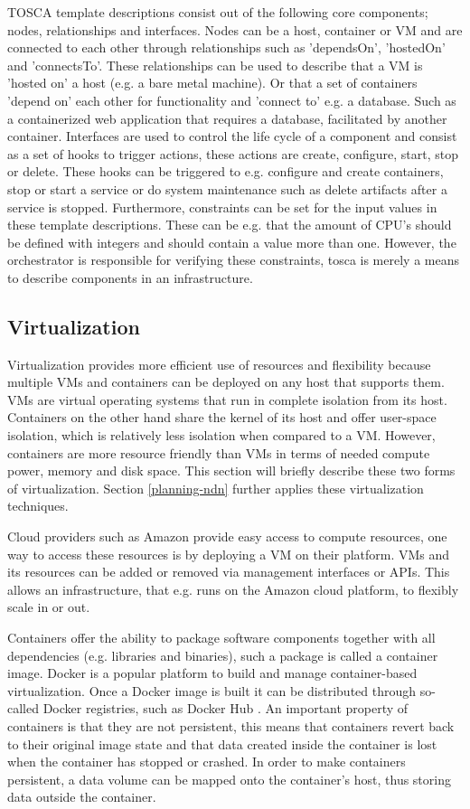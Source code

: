 TOSCA template descriptions consist out of the following core components; nodes, relationships and interfaces. Nodes can be a host, container or VM and are connected to each other through relationships such as 'dependsOn', 'hostedOn' and 'connectsTo'. These relationships can be used to describe that a VM is 'hosted on' a host (e.g. a bare metal machine). Or that a set of containers 'depend on' each other for functionality and 'connect to' e.g. a database. Such as a containerized web application that requires a database, facilitated by another container. Interfaces are used to control the life cycle of a component and consist as a set of hooks to trigger actions, these actions are create, configure, start, stop or delete. These hooks can be triggered to e.g. configure and create containers, stop or start a service or do system maintenance such as delete artifacts after a service is stopped. Furthermore, constraints can be set for the input values in these template descriptions. These can be e.g. that the amount of CPU's should be defined with integers and should contain a value more than one. However, the orchestrator is responsible for verifying these constraints, \gls{tosca} is merely a means to describe components in an infrastructure.

\subsection{Virtualization}
\label{overview-virtualization}
Virtualization provides more efficient use of resources and flexibility because multiple VMs and containers can be deployed on any host that supports them. VMs are virtual operating systems that run in complete isolation from its host. Containers on the other hand share the kernel of its host and offer user-space isolation, which is relatively less isolation when compared to a VM. However, containers are more resource friendly than VMs in terms of needed compute power, memory and disk space. This section will briefly describe these two forms of virtualization. Section \ref{planning-ndn} further applies these virtualization techniques.

Cloud providers such as Amazon provide easy access to compute resources, one way to access these resources is by deploying a VM on their platform. VMs and its resources can be added or removed via management interfaces or APIs. This allows an infrastructure, that e.g. runs on the Amazon cloud platform, to flexibly scale in or out.

Containers offer the ability to package software components together with all dependencies (e.g. libraries and binaries), such a package is called a container image. Docker is a popular platform to build and manage container-based virtualization. Once a Docker image is built it can be distributed through so-called Docker registries, such as Docker Hub \cite{dockerhub-website}. An important property of containers is that they are not persistent, this means that containers revert back to their original image state and that data created inside the container is lost when the container has stopped or crashed. In order to make containers persistent, a data volume can be mapped onto the container's host, thus storing data outside the container.

